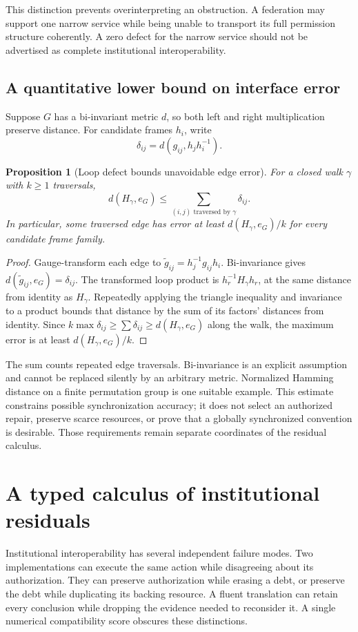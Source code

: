\documentclass[11pt,letterpaper]{article}
\theoremstyle{plain}
\newtheorem{proposition}{Proposition}[section]
\theoremstyle{definition}
\theoremstyle{remark}
\begin{document}
This distinction prevents overinterpreting an obstruction. A federation may support one narrow service while being unable to transport its full permission structure coherently. A zero defect for the narrow service should not be advertised as complete institutional interoperability.

\subsection{A quantitative lower bound on interface error}
Suppose $G$ has a bi-invariant metric $d$, so both left and right multiplication preserve distance. For candidate frames $h_i$, write
\[
\delta_{ij}=d(g_{ij},h_jh_i^{-1}).
\]
\begin{proposition}[Loop defect bounds unavoidable edge error]\label{prop:holonomybound}
For a closed walk $\gamma$ with $k\ge1$ traversals,
\[
d(H_\gamma,e_G)\le\sum_{(i,j)\text{ traversed by }\gamma}\delta_{ij}.
\]
In particular, some traversed edge has error at least $d(H_\gamma,e_G)/k$ for every candidate frame family.
\end{proposition}
\begin{proof}
Gauge-transform each edge to $\widetilde g_{ij}=h_j^{-1}g_{ij}h_i$. Bi-invariance gives $d(\widetilde g_{ij},e_G)=\delta_{ij}$. The transformed loop product is $h_r^{-1}H_\gamma h_r$, at the same distance from identity as $H_\gamma$. Repeatedly applying the triangle inequality and invariance to a product bounds that distance by the sum of its factors' distances from identity. Since $k\max\delta_{ij}\ge\sum\delta_{ij}\ge d(H_\gamma,e_G)$ along the walk, the maximum error is at least $d(H_\gamma,e_G)/k$.
\end{proof}

The sum counts repeated edge traversals. Bi-invariance is an explicit assumption and cannot be replaced silently by an arbitrary metric. Normalized Hamming distance on a finite permutation group is one suitable example. This estimate constrains possible synchronization accuracy; it does not select an authorized repair, preserve scarce resources, or prove that a globally synchronized convention is desirable. Those requirements remain separate coordinates of the residual calculus.

\section{A typed calculus of institutional residuals}\label{sec:residuals}
Institutional interoperability has several independent failure modes. Two implementations can execute the same action while disagreeing about its authorization. They can preserve authorization while erasing a debt, or preserve the debt while duplicating its backing resource. A fluent translation can retain every conclusion while dropping the evidence needed to reconsider it. A single numerical compatibility score obscures these distinctions.
\end{document}

